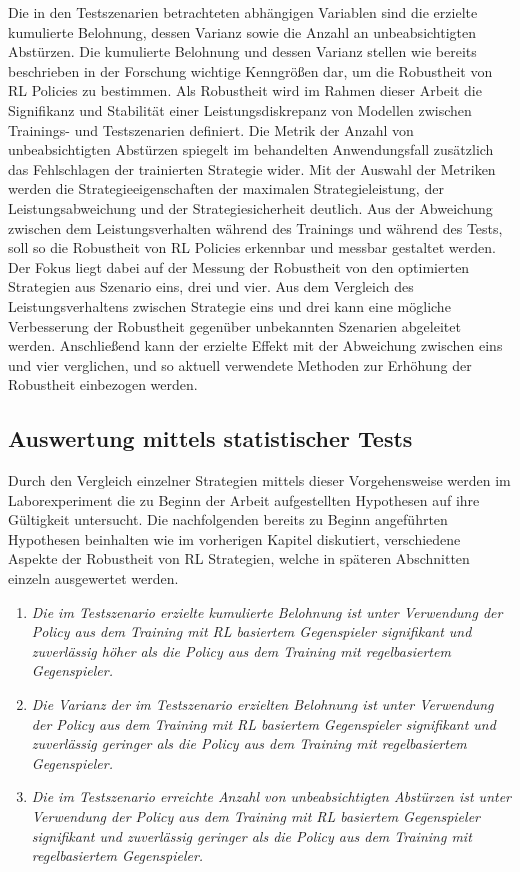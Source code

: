 Die in den Testszenarien betrachteten abhängigen Variablen sind die erzielte kumulierte Belohnung, dessen Varianz sowie die Anzahl an unbeabsichtigten Abstürzen.
Die kumulierte Belohnung und dessen Varianz stellen wie bereits beschrieben in der Forschung wichtige Kenngrößen dar, um die Robustheit von RL Policies zu bestimmen.
Als Robustheit wird im Rahmen dieser Arbeit die Signifikanz und Stabilität einer Leistungsdiskrepanz von Modellen zwischen Trainings- und Testszenarien definiert.
Die Metrik der Anzahl von unbeabsichtigten Abstürzen spiegelt im behandelten Anwendungsfall zusätzlich das Fehlschlagen der trainierten Strategie wider.
Mit der Auswahl der Metriken werden die Strategieeigenschaften der maximalen Strategieleistung, der Leistungsabweichung und der Strategiesicherheit deutlich.
Aus der Abweichung zwischen dem Leistungsverhalten während des Trainings und während des Tests, soll so die Robustheit von RL Policies erkennbar und messbar gestaltet werden.
Der Fokus liegt dabei auf der Messung der Robustheit von den optimierten Strategien aus Szenario eins, drei und vier.
Aus dem Vergleich des Leistungsverhaltens zwischen Strategie eins und drei kann eine mögliche Verbesserung der Robustheit gegenüber unbekannten Szenarien abgeleitet werden.
Anschließend kann der erzielte Effekt mit der Abweichung zwischen eins und vier verglichen, und so aktuell verwendete Methoden zur Erhöhung der Robustheit einbezogen werden.

\subsection{Auswertung mittels statistischer Tests}

Durch den Vergleich einzelner Strategien mittels dieser Vorgehensweise werden im Laborexperiment die zu Beginn der Arbeit aufgestellten Hypothesen auf ihre Gültigkeit untersucht.
Die nachfolgenden bereits zu Beginn angeführten Hypothesen beinhalten wie im vorherigen Kapitel diskutiert, verschiedene Aspekte der Robustheit von RL Strategien, welche in späteren Abschnitten einzeln ausgewertet werden.
\begin{enumerate}
    \item \textit{Die im Testszenario erzielte kumulierte Belohnung ist unter Verwendung der Policy aus dem Training mit RL basiertem Gegenspieler signifikant und zuverlässig höher als die Policy aus dem Training mit regelbasiertem Gegenspieler.}
    \item \textit{Die Varianz der im Testszenario erzielten Belohnung ist unter Verwendung der Policy aus dem Training mit RL basiertem Gegenspieler signifikant und zuverlässig geringer als die Policy aus dem Training mit regelbasiertem Gegenspieler.}
    \item \textit{Die im Testszenario erreichte Anzahl von unbeabsichtigten Abstürzen ist unter Verwendung der Policy aus dem Training mit RL basiertem Gegenspieler signifikant und zuverlässig geringer als die Policy aus dem Training mit regelbasiertem Gegenspieler.}
\end{enumerate}

